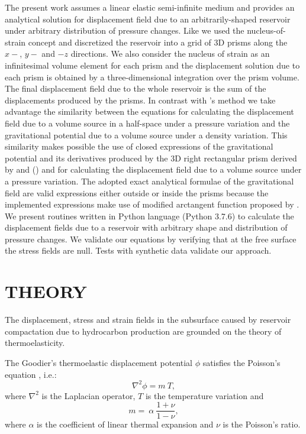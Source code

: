 \documentclass[journal abbreviation, manuscript]{copernicus}
\begin{document}
The present work assumes a linear elastic semi-infinite medium and provides an analytical solution for displacement field due to an arbitrarily-shaped reservoir under arbitrary distribution of pressure changes. 
Like \cite{Munoz&Roehl17} we used the nucleus-of-strain concept and discretized the
reservoir into a grid of 3D prisms along the $x-$, $y-$ and $-z$ directions.
We also consider the nucleus of strain as an infinitesimal volume element  for each prism and the displacement solution due to each prism is obtained by a three-dimensional integration over the prism volume. 
The final displacement field due to the whole reservoir is the sum of the displacements produced by the prisms. 
In contrast with \cite{Munoz&Roehl17}'s method we take advantage the similarity between 
the  equations for calculating the displacement field due to a volume source in a half-space under a pressure variation and the gravitational potential due to a volume source under a density variation.
This similarity makes possible the use of closed expressions of the gravitational potential and its derivatives produced by the 3D right rectangular prism derived by \cite{Nagyetal2000} and (\citeyear{Nagyetal2002}) and \cite{Fukushima2020}  for calculating the displacement field due to a volume source under a pressure variation.
The adopted exact analytical formulae of the gravitational field  are valid expressions either outside or inside the prisms because the implemented expressions make use of  modified arctangent function proposed by \cite{Fukushima2020}. 
We present routines written in Python language (Python 3.7.6)  to calculate the displacement fields due to a reservoir with arbitrary shape and distribution of pressure changes. 
We validate our equations by verifying that at the free surface the stress fields are null.
Tests with synthetic data validate our approach. 

\section{THEORY}

The displacement, stress and strain fields in the subsurface caused by reservoir compactation due to hydrocarbon production are grounded on the theory of thermoelasticity. 

The Goodier’s thermoelastic displacement potential $\phi$ satisfies the Poisson's equation \citep{Goodier37}, i.e.:
\begin{equation}
\nabla^{2} \phi =  m \: T,
\label{eq:poisson}
\end{equation}
where $\nabla^{2}$ is the Laplacian operator, $T $ is the temperature variation and 
\begin{equation}
m =  \:  \alpha \: \frac{1 + \nu}{ 1 -\nu},
\label{eq:m}
\end{equation}
where $\alpha$ is the coefficient of linear thermal expansion and $\nu$ is the Poisson's ratio.
\end{document}
